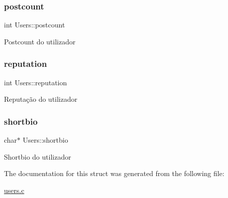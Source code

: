 \subsubsection{\texorpdfstring{postcount}{postcount}}
{\footnotesize\ttfamily int Users\+::postcount}

Postcount do utilizador \mbox{\label{structUsers_ae38c9ce8c1d3490cb9cb354f16363081}} 
\subsubsection{\texorpdfstring{reputation}{reputation}}
{\footnotesize\ttfamily int Users\+::reputation}

Reputação do utilizador \mbox{\label{structUsers_acfa48f1fdcd5f32884c5455a99460459}} 
\subsubsection{\texorpdfstring{shortbio}{shortbio}}
{\footnotesize\ttfamily char$\ast$ Users\+::shortbio}

Shortbio do utilizador 

The documentation for this struct was generated from the following file\+:\begin{DoxyCompactItemize}
\item 
\hyperlink{users_8c}{users.\+c}\end{DoxyCompactItemize}
